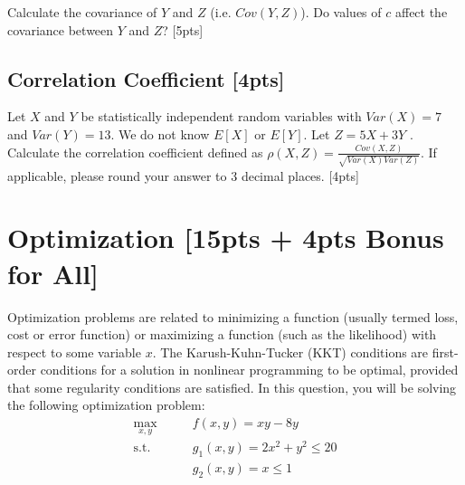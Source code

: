 \documentclass{article}
\begin{document}
\newline 
\noindent Calculate the covariance of $Y$ and $Z$ (i.e. $Cov(Y, Z)$). Do values of $c$ affect the covariance between $Y$ and $Z$? [5pts]


\subsection{Correlation Coefficient [4pts]}
Let $X$ and $Y$ be statistically independent random variables with $Var(X) = 7$ and $Var(Y) = 13$. We do not know $E[X]$ or $E[Y]$. Let $Z = 5X + 3Y$ . Calculate the correlation coefficient defined as $\rho(X,Z)=\frac{Cov(X,Z)}{\sqrt{Var(X)Var(Z)}}$. If applicable, please round your answer to 3 decimal places. [4pts]



\newpage
\section{Optimization [15pts + 4pts Bonus for All]}
Optimization problems are related to minimizing a function (usually termed loss, cost or error function) or maximizing a function (such as the likelihood) with respect to some variable $x$. The Karush-Kuhn-Tucker (KKT) conditions are first-order conditions for a solution in nonlinear programming to be optimal, provided that some regularity conditions are satisfied. In this question, you will be solving the following optimization problem:
\begin{align*}
    \max_{x,y} \qquad & f(x,y) = xy-8y \\
    \text{s.t.} \qquad & g_{1}(x,y) = 2x^{2}+y^{2}\leq 20 \\
    & g_{2}(x,y) = x \leq 1
\end{align*}
\end{document}
